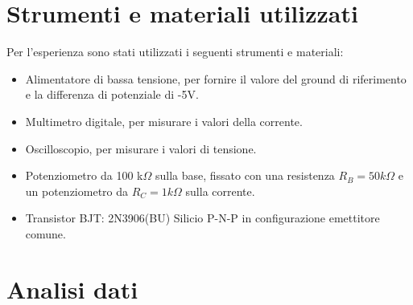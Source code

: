 \documentclass[a4paper, 11pt]{article}
\begin{document}
\section{Strumenti e materiali utilizzati}
Per l'esperienza sono stati utilizzati i seguenti strumenti e materiali:
\begin{itemize}
    \item Alimentatore di bassa tensione, per fornire il valore del ground di riferimento e la differenza di potenziale di -5V.
    \item Multimetro digitale, per misurare i valori della corrente.
    \item Oscilloscopio, per misurare i valori di tensione.
    \item Potenziometro da 100 k$\Omega$ sulla base, fissato con una resistenza $R_B = 50 k\Omega$ e un potenziometro da $R_C = 1 k\Omega$ sulla corrente.
    \item Transistor BJT: 2N3906(BU) Silicio P-N-P in configurazione emettitore comune.
\end{itemize}


\section{Analisi dati}
\end{document}
